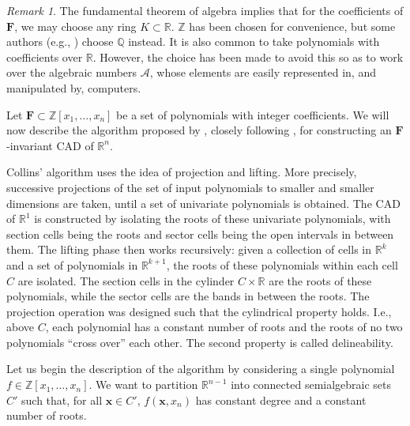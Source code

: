 \documentclass[
]{book}
\theoremstyle{definition}
\theoremstyle{definition}
\theoremstyle{definition}
\theoremstyle{definition}
\theoremstyle{remark}
\newtheorem*{remark}{Remark}
\begin{document}
\begin{remark}
The fundamental theorem of algebra implies that for the coefficients of \(\mathbf{F}\), we may choose any ring \(K \subset \mathbb{R}\). \(\mathbb{Z}\) has been chosen for convenience, but some authors (e.g., \citet{pianomovers1983}) choose \(\mathbb{Q}\) instead. It is also common to take polynomials with coefficients over \(\mathbb{R}\). However, the choice has been made to avoid this so as to work over the algebraic numbers \(\mathcal{A}\), whose elements are easily represented in, and manipulated by, computers.
\end{remark}

Let \(\mathbf{F} \subset \mathbb{Z}[x_1,\ldots,x_n]\) be a set of polynomials with integer coefficients. We will now describe the algorithm proposed by \citet{collins1975}, closely following \citet{coste2000}, for constructing an \(\mathbf{F}\)-invariant CAD of \(\mathbb{R}^n\).

Collins' algorithm uses the idea of projection and lifting. More precisely, successive projections of the set of input polynomials to smaller and smaller dimensions are taken, until a set of univariate polynomials is obtained. The CAD of \(\mathbb{R}^1\) is constructed by isolating the roots of these univariate polynomials, with section cells being the roots and sector cells being the open intervals in between them. The lifting phase then works recursively: given a collection of cells in \(\mathbb{R}^k\) and a set of polynomials in \(\mathbb{R}^{k+1}\), the roots of these polynomials within each cell \(C\) are isolated. The section cells in the cylinder \(C \times \mathbb{R}\) are the roots of these polynomials, while the sector cells are the bands in between the roots. The projection operation was designed such that the cylindrical property holds. I.e., above \(C\), each polynomial has a constant number of roots and the roots of no two polynomials ``cross over'' each other.
The second property is called delineability.

Let us begin the description of the algorithm by considering a single polynomial \(f \in \mathbb{Z}[x_1,\ldots,x_n]\).
We want to partition \(\mathbb{R}^{n-1}\) into connected semialgebraic sets \(C'\) such that, for all \(\mathbf{x} \in C'\), \(f(\mathbf{x},x_n)\) has constant degree and a constant number of roots.
\end{document}
